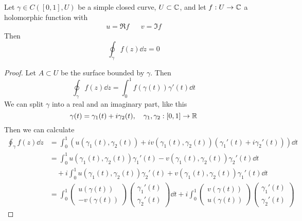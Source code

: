 \documentclass[../../script.tex]{subfiles}
\begin{document}
\begin{cor}
    Let $\gamma \in C([0, 1], U)$ be a simple closed curve, $U \subset \mathbb{C}$, and let $f: U \rightarrow \mathbb{C}$ a holomorphic function with 
    \begin{align*}
        u = \Re f && v = \Im f
    \end{align*}
    Then 
    \[
        \oint_{\gamma} f(z) \dd{z} = 0
    \]
\end{cor}
\begin{proof}
    Let $A \subset U$ be the surface bounded by $\gamma$. Then 
    \begin{equation}
        \oint_{\gamma} f(z) \dd{z} = \int_0^1 f(\gamma(t)) \gamma'(t) \dd{t}
    \end{equation}
    We can split $\gamma$ into a real and an imaginary part, like this 
    \begin{equation}
        \gamma(t) = \gamma_1(t) + i\gamma_2(t), \quad \gamma_1, \gamma_2: [0, 1] \rightarrow \mathbb{R}
    \end{equation}
    Then we can calculate 
    \begin{equation}
        \begin{split}
            \oint_{\gamma} f(z) \dd{z} &= \int_0^1 \left(u(\gamma_1(t), \gamma_2(t)) + iv(\gamma_1(t), \gamma_2(t)) (\gamma_1'(t) + i\gamma_2'(t))\right) \dd{t} \\
            &= \int_0^1 u(\gamma_1(t), \gamma_2(t)) \gamma_1'(t) - v(\gamma_1(t), \gamma_2(t)) \gamma_2'(t) \dd{t} \\
            &\quad + i\int_0^1 u(\gamma_1(t), \gamma_2(t))\gamma_2'(t) + v(\gamma_1(t), \gamma_2(t))\gamma_1'(t) \dd{t} \\
            &= \int_0^1 \begin{pmatrix}
                u(\gamma(t)) \\ -v(\gamma(t))
            \end{pmatrix}
            \begin{pmatrix}
                \gamma_1'(t) \\ \gamma_2'(t)
            \end{pmatrix}
            \dd{t} + i \int_0^1 \begin{pmatrix}
                v(\gamma(t)) \\ u(\gamma(t))
            \end{pmatrix}
            \begin{pmatrix}
                \gamma_1'(t) \\ \gamma_2'(t)
            \end{pmatrix}

\end{split}
\end{equation}
\end{proof}
\end{document}

